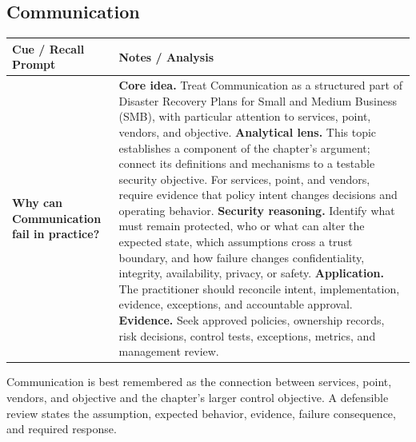 \documentclass[11pt]{article}
\newcommand{\CornellHeader}{%
\rowcolor{Navy}\color{white}\bfseries Cue / Recall Prompt & \color{white}\bfseries Notes / Analysis\\\hline}
\newcommand{\CornellRow}[2]{%
\cellcolor{CueGray}\RaggedRight\textbf{#1} & \RaggedRight #2\\\hline}
\begin{document}
\subsection*{Communication}
\begin{longtable}{>{\RaggedRight\arraybackslash}p{}|>{\RaggedRight\arraybackslash}p{}}
\CornellHeader
\CornellRow{Why can Communication fail in practice?}{\textbf{Core idea.} Treat Communication as a structured part of Disaster Recovery Plans for Small and Medium Business (SMB), with particular attention to services, point, vendors, and objective. \textbf{Analytical lens.} This topic establishes a component of the chapter's argument; connect its definitions and mechanisms to a testable security objective. For services, point, and vendors, require evidence that policy intent changes decisions and operating behavior. \textbf{Security reasoning.} Identify what must remain protected, who or what can alter the expected state, which assumptions cross a trust boundary, and how failure changes confidentiality, integrity, availability, privacy, or safety. \textbf{Application.} The practitioner should reconcile intent, implementation, evidence, exceptions, and accountable approval. \textbf{Evidence.} Seek approved policies, ownership records, risk decisions, control tests, exceptions, metrics, and management review.}
\end{longtable}
\begin{topicsummary}
Communication is best remembered as the connection between services, point, vendors, and objective and the chapter's larger control objective. A defensible review states the assumption, expected behavior, evidence, failure consequence, and required response.
\end{topicsummary}
\end{document}
